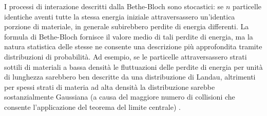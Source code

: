 \documentclass[12pt,a4paper,twoside]{report}
\begin{document}
	I processi di interazione descritti dalla Bethe-Bloch sono stocastici: se $n$ particelle identiche aventi tutte la stessa energia iniziale attraversassero un'identica porzione di materiale, in generale subirebbero perdite di energia differenti. La formula di Bethe-Bloch fornisce il valore medio di tali perdite di energia, ma la natura statistica delle stesse ne consente una descrizione più approfondita tramite distribuzioni di probabilità. Ad esempio, se le particelle attraversassero strati sottili di materiali a bassa densità le fluttuazioni delle perdite di energia per unità di lunghezza sarebbero ben descritte da una distribuzione di Landau, altrimenti per spessi strati di materia ad alta densità la distribuzione sarebbe sostanzialmente Gaussiana (a causa del maggiore numero di collisioni che consente l'applicazione del teorema del limite centrale) \cite{bortolettoLecture,betheFormula}.
	
\end{document}
